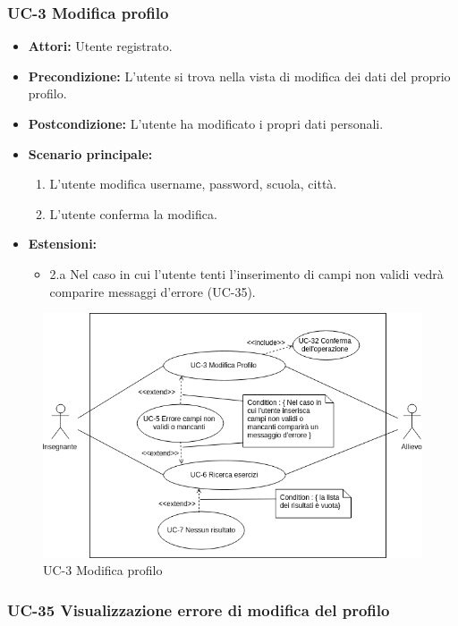 \subsubsection{UC-3 Modifica profilo}
		\begin{itemize}
			\item \textbf{Attori:} Utente registrato.
			\item \textbf{Precondizione:} L'utente si trova nella vista di modifica dei dati del proprio profilo.
			\item \textbf{Postcondizione:} L'utente ha modificato i propri dati personali.
			\item \textbf{Scenario principale:}
				\begin{enumerate}
					\item L'utente modifica username, password, scuola, città.
					\item L'utente conferma la modifica. 
				\end{enumerate}
				\item \textbf{Estensioni:}
				\begin{itemize}
					\item 2.a Nel caso in cui l'utente tenti l'inserimento di campi non validi vedrà comparire messaggi d'errore (UC-35).
				\end{itemize}
		\end{itemize}
		\begin{figure}[htbp]
		\centering
		\includegraphics[scale=0.7]{images/UC-3.png}
		\caption{UC-3 Modifica profilo}
	\end{figure}
	
\subsubsection{UC-35 Visualizzazione errore di modifica del profilo}	
	
